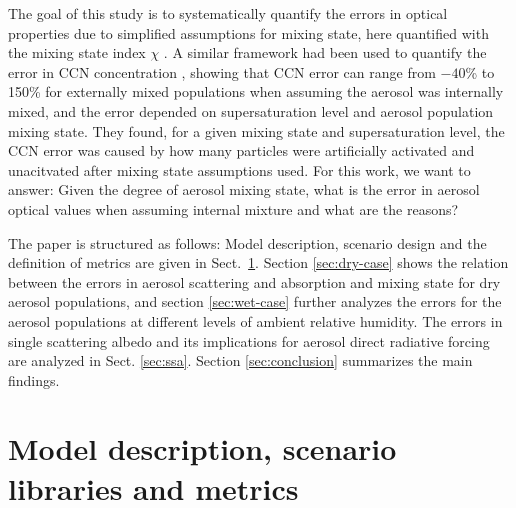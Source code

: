 \documentclass[edeposit,fullpage]{uiucthesis2009}
\begin{document}
The goal of this study is to systematically quantify the errors in
optical properties due to simplified assumptions for mixing state,
here quantified with the mixing state index $\chi$
\citet{Riemer2013a}. A similar framework had been used to quantify the
error in CCN concentration \citep{Ching2017}, showing that CCN error can range from $-40$\% to
150\% for externally mixed populations when assuming the aerosol was internally mixed, and the error
depended on supersaturation level and aerosol population mixing state. They found, for a given mixing state and supersaturation level,
the CCN error was caused by how many particles were artificially activated and unacitvated after mixing state assumptions used. For this work, 
we want to answer: Given the degree of aerosol mixing state, 
what is the error in aerosol optical values when assuming internal mixture and what are the reasons?


The paper is structured as follows: Model description, scenario design
and the definition of metrics are given in
Sect.~\ref{sec:methods}. Section \ref{sec:dry-case} shows the
relation between the errors in aerosol scattering and absorption and
mixing state for dry aerosol populations, and section
\ref{sec:wet-case} further analyzes the errors for the aerosol
populations at different levels of ambient relative humidity. The
errors in single scattering albedo and its implications for aerosol
direct radiative forcing are analyzed in
Sect. \ref{sec:ssa}. Section \ref{sec:conclusion} summarizes
the main findings.

\section{Model description, scenario libraries and metrics }
\label{sec:methods}
\end{document}
